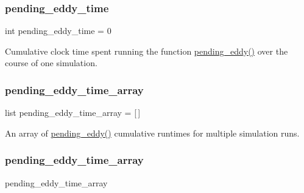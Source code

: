 \subsubsection{\texorpdfstring{pending\_eddy\_time}{pending\_eddy\_time}}
{\footnotesize\ttfamily int pending\+\_\+eddy\+\_\+time = 0\hspace{0.3cm}{\ttfamily [static]}}



Cumulative clock time spent running the function \mbox{\hyperlink{namespacedynamicfilterapp_1_1views__helpers_ad11bcb9737901ab723493b4f7fe09329}{pending\+\_\+eddy()}} over the course of one simulation. 

\mbox{\label{classdynamicfilterapp_1_1test__simulations_1_1_simulation_test_a52b2537908d48417dca35915eadfad89}} 
\subsubsection{\texorpdfstring{pending\_eddy\_time\_array}{pending\_eddy\_time\_array}\hspace{0.1cm}{\footnotesize\ttfamily [1/2]}}
{\footnotesize\ttfamily list pending\+\_\+eddy\+\_\+time\+\_\+array = \mbox{[}$\,$\mbox{]}\hspace{0.3cm}{\ttfamily [static]}}



An array of \mbox{\hyperlink{namespacedynamicfilterapp_1_1views__helpers_ad11bcb9737901ab723493b4f7fe09329}{pending\+\_\+eddy()}} cumulative runtimes for multiple simulation runs. 

\mbox{\label{classdynamicfilterapp_1_1test__simulations_1_1_simulation_test_ac43dbd5383856adba1c0ee599f20564d}} 
\subsubsection{\texorpdfstring{pending\_eddy\_time\_array}{pending\_eddy\_time\_array}\hspace{0.1cm}{\footnotesize\ttfamily [2/2]}}
{\footnotesize\ttfamily pending\+\_\+eddy\+\_\+time\+\_\+array}

